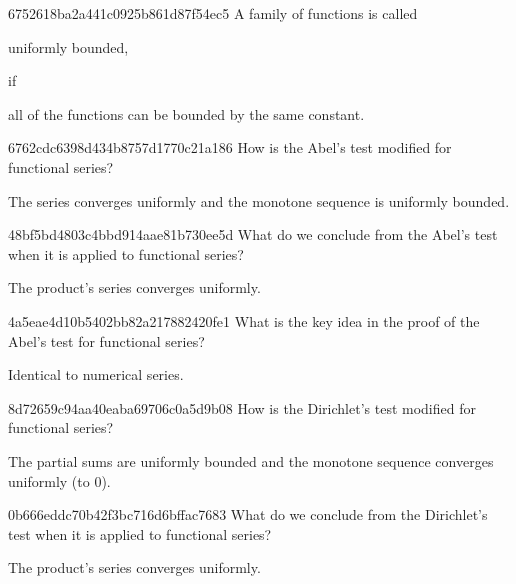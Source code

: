 \begin{note}{6752618ba2a441c0925b861d87f54ec5}
    A family of functions is called \begin{icloze}{2}uniformly bounded,\end{icloze} if \begin{icloze}{1}all of the functions can be bounded by the same constant.\end{icloze}
\end{note}

\begin{note}{6762cdc6398d434b8757d1770c21a186}
    How is the Abel's test modified for functional series?

    \begin{cloze}{1}
        The series converges uniformly and the monotone sequence is uniformly bounded.
    \end{cloze}
\end{note}

\begin{note}{48bf5bd4803c4bbd914aae81b730ee5d}
    What do we conclude from the Abel's test when it is applied to functional series?

    \begin{cloze}{1}
        The product's series converges uniformly.
    \end{cloze}
\end{note}

\begin{note}{4a5eae4d10b5402bb82a217882420fe1}
    What is the key idea in the proof of the Abel's test for functional series?

    \begin{cloze}{1}
        Identical to numerical series.
    \end{cloze}
\end{note}

\begin{note}{8d72659c94aa40eaba69706c0a5d9b08}
   How is the Dirichlet's test modified for functional series?

   \begin{cloze}{1}
        The partial sums are uniformly bounded and the monotone sequence converges uniformly (to \({ 0 }\)).
   \end{cloze}
\end{note}

\begin{note}{0b666eddc70b42f3bc716d6bffac7683}
    What do we conclude from the Dirichlet's test when it is applied to functional series?

    \begin{cloze}{1}
        The product's series converges uniformly.
    \end{cloze}
\end{note}

